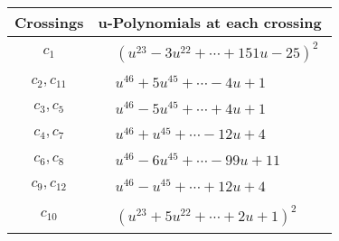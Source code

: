 \documentclass[1p]{elsarticle_modified}
\theoremstyle{definition}
\begin{document}
\begin{tabular}{m{50pt}|m{274pt}}
Crossings & \hspace{64pt}u-Polynomials at each crossing \\
\hline $$\begin{aligned}c_{1}\end{aligned}$$&$\begin{aligned}
&(u^{23}-3 u^{22}+\cdots+151 u-25)^{2}
\end{aligned}$\\
\hline $$\begin{aligned}c_{2},c_{11}\end{aligned}$$&$\begin{aligned}
&u^{46}+5 u^{45}+\cdots-4 u+1
\end{aligned}$\\
\hline $$\begin{aligned}c_{3},c_{5}\end{aligned}$$&$\begin{aligned}
&u^{46}-5 u^{45}+\cdots+4 u+1
\end{aligned}$\\
\hline $$\begin{aligned}c_{4},c_{7}\end{aligned}$$&$\begin{aligned}
&u^{46}+u^{45}+\cdots-12 u+4
\end{aligned}$\\
\hline $$\begin{aligned}c_{6},c_{8}\end{aligned}$$&$\begin{aligned}
&u^{46}-6 u^{45}+\cdots-99 u+11
\end{aligned}$\\
\hline $$\begin{aligned}c_{9},c_{12}\end{aligned}$$&$\begin{aligned}
&u^{46}- u^{45}+\cdots+12 u+4
\end{aligned}$\\
\hline $$\begin{aligned}c_{10}\end{aligned}$$&$\begin{aligned}
&(u^{23}+5 u^{22}+\cdots+2 u+1)^{2}
\end{aligned}$\\
\hline
\end{tabular}\\~\\
\newpage\renewcommand{\arraystretch}{1}
\end{document}
